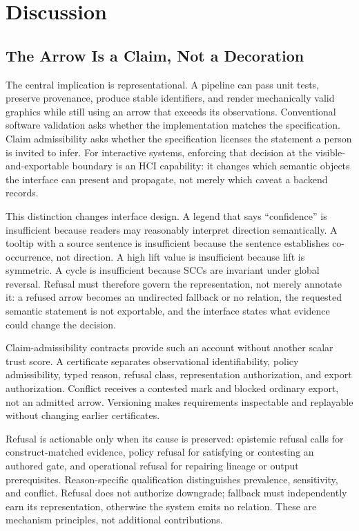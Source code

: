 \documentclass[manuscript,screen,review,anonymous]{acmart}
\begin{document}
\section{Discussion}

\subsection{The Arrow Is a Claim, Not a Decoration}

The central implication is representational. A pipeline can pass unit tests, preserve provenance, produce stable identifiers, and render mechanically valid graphics while still using an arrow that exceeds its observations. Conventional software validation asks whether the implementation matches the specification. Claim admissibility asks whether the specification licenses the statement a person is invited to infer. For interactive systems, enforcing that decision at the visible-and-exportable boundary is an HCI capability: it changes which semantic objects the interface can present and propagate, not merely which caveat a backend records.

This distinction changes interface design. A legend that says ``confidence'' is insufficient because readers may reasonably interpret direction semantically. A tooltip with a source sentence is insufficient because the sentence establishes co-occurrence, not direction. A high lift value is insufficient because lift is symmetric. A cycle is insufficient because SCCs are invariant under global reversal. Refusal must therefore govern the representation, not merely annotate it: a refused arrow becomes an undirected fallback or no relation, the requested semantic statement is not exportable, and the interface states what evidence could change the decision.

Claim-admissibility contracts provide such an account without another scalar trust score. A certificate separates observational identifiability, policy admissibility, typed reason, refusal class, representation authorization, and export authorization. Conflict receives a contested mark and blocked ordinary export, not an admitted arrow. Versioning makes requirements inspectable and replayable without changing earlier certificates.

Refusal is actionable only when its cause is preserved: epistemic refusal calls for construct-matched evidence, policy refusal for satisfying or contesting an authored gate, and operational refusal for repairing lineage or output prerequisites. Reason-specific qualification distinguishes prevalence, sensitivity, and conflict. Refusal does not authorize downgrade; fallback must independently earn its representation, otherwise the system emits no relation. These are mechanism principles, not additional contributions.
\end{document}
